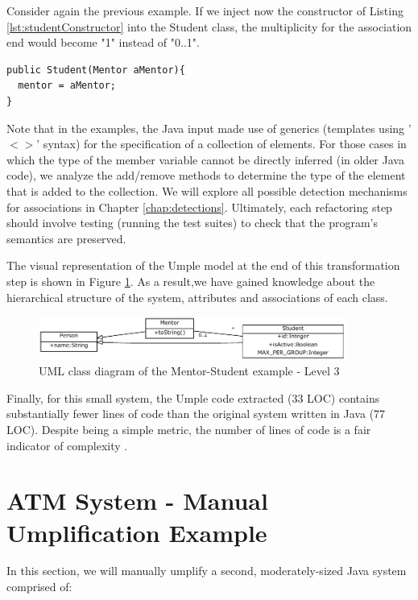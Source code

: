 Consider again the previous example.  If we inject now the constructor of Listing \ref{lst:studentConstructor} into the Student class, the multiplicity for the association end would become "1" instead of "0..1". 

\begin{lstlisting}[style=java,caption=A new constructor added to Student class,label=lst:studentConstructor]
public Student(Mentor aMentor){
  mentor = aMentor;
}
\end{lstlisting}

Note that in the examples, the Java input made use of generics (templates using '$<>$' syntax) for the specification of a collection of elements. For those cases in which the type of the member variable cannot be directly inferred (in older Java code), we analyze the add/remove methods to determine the type of the element that is added to the collection. We will explore all possible detection mechanisms for associations in Chapter \ref{chap:detections}. Ultimately, each refactoring step should involve testing (running the test suites) to check that the program's semantics are preserved. 

The visual representation of the Umple model at the end of this transformation step is shown in Figure \ref{fig:Example1a3}. As a result,we have gained knowledge about the hierarchical structure of the system, attributes and associations of each class. 

\begin{figure}[h]
\centering
\includegraphics[width=0.90\textwidth]{Figures/Example1a3.pdf} 
\caption{UML class diagram of the Mentor-Student example - Level 3}
\label{fig:Example1a3}
\end{figure}

Finally, for this small system, the Umple code extracted (33 LOC) contains substantially fewer lines of code than the original system written in Java (77 LOC). Despite being a simple metric, the number of lines of code is a fair indicator of complexity \cite{LOCMetric}. 

\section{ATM System - Manual Umplification Example}

In this section, we will manually umplify a second, moderately-sized Java system comprised of:

